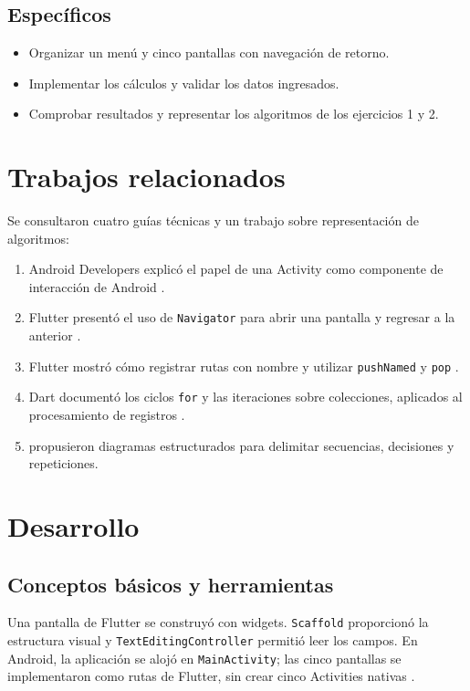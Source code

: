 \documentclass[12pt,letterpaper]{article}
\begin{document}
\subsection{Específicos}
\begin{itemize}
\item Organizar un menú y cinco pantallas con navegación de retorno.
\item Implementar los cálculos y validar los datos ingresados.
\item Comprobar resultados y representar los algoritmos de los ejercicios 1 y 2.
\end{itemize}

\section{Trabajos relacionados}
Se consultaron cuatro guías técnicas y un trabajo sobre representación de algoritmos:
\begin{enumerate}
\item Android Developers explicó el papel de una Activity como componente de interacción de Android \citep{android}.
\item Flutter presentó el uso de \texttt{Navigator} para abrir una pantalla y regresar a la anterior \citep{navegacion}.
\item Flutter mostró cómo registrar rutas con nombre y utilizar \texttt{pushNamed} y \texttt{pop} \citep{rutas}.
\item Dart documentó los ciclos \texttt{for} y las iteraciones sobre colecciones, aplicados al procesamiento de registros \citep{dart}.
\item \citet{ns} propusieron diagramas estructurados para delimitar secuencias, decisiones y repeticiones.
\end{enumerate}

\section{Desarrollo}
\subsection{Conceptos básicos y herramientas}
Una pantalla de Flutter se construyó con widgets. \texttt{Scaffold} proporcionó la estructura visual y \texttt{TextEditingController} permitió leer los campos. En Android, la aplicación se alojó en \texttt{MainActivity}; las cinco pantallas se implementaron como rutas de Flutter, sin crear cinco Activities nativas \citep{android,navegacion}.
\end{document}

